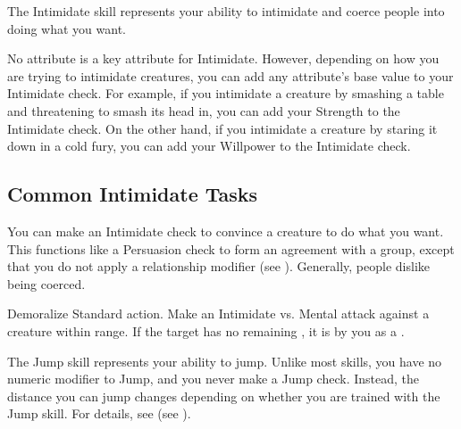 \newpage
{}
  The Intimidate skill represents your ability to intimidate and coerce people into doing what you want.

  No attribute is a key attribute for Intimidate.
  However, depending on how you are trying to intimidate creatures, you can add any attribute's base value to your Intimidate check.
  For example, if you intimidate a creature by smashing a table and threatening to smash its head in, you can add your Strength to the Intimidate check.
  On the other hand, if you intimidate a creature by staring it down in a cold fury, you can add your Willpower to the Intimidate check.

  \subsection{Common Intimidate Tasks}
     You can make an Intimidate check to convince a creature to do what you want. This functions like a Persuasion check to form an agreement with a group, except that you do not apply a relationship modifier (see ).
    Generally, people dislike being coerced.

    \begin{activeability}{Demoralize}
      \abilityusagetime Standard action.
      \rankline
      Make an Intimidate vs. Mental attack against a creature within \rngmed range.
      \hit If the target has no remaining , it is \frightened by you as a .
    \end{activeability}

\newpage
{}
  The Jump skill represents your ability to jump.
  Unlike most skills, you have no numeric modifier to Jump, and you never make a Jump check.
  Instead, the distance you can jump changes depending on whether you are trained with the Jump skill.
  For details, see (see ).

